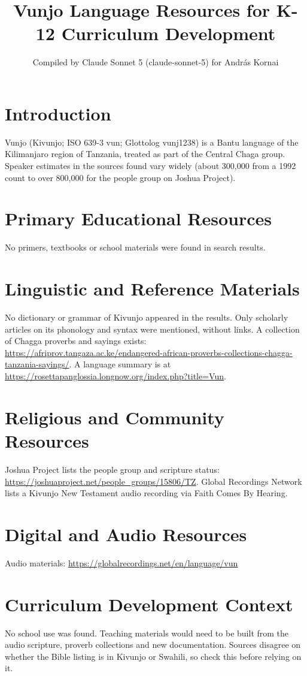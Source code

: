 \documentclass[12pt]{article}
\title{Vunjo Language Resources for K-12 Curriculum Development}
\author{Compiled by Claude Sonnet 5 (claude-sonnet-5) for Andr\'as Kornai}
\date{}
\begin{document}
\maketitle
\section{Introduction}
Vunjo (Kivunjo; ISO 639-3 vun; Glottolog vunj1238) is a Bantu language of the Kilimanjaro region of Tanzania, treated as part of the Central Chaga group. Speaker estimates in the sources found vary widely (about 300,000 from a 1992 count to over 800,000 for the people group on Joshua Project).
\section{Primary Educational Resources}
No primers, textbooks or school materials were found in search results.
\section{Linguistic and Reference Materials}
No dictionary or grammar of Kivunjo appeared in the results. Only scholarly articles on its phonology and syntax were mentioned, without links. A collection of Chagga proverbs and sayings exists: \url{https://afriprov.tangaza.ac.ke/endangered-african-proverbs-collections-chagga-tanzania-sayings/}. A language summary is at \url{https://rosettapanglossia.longnow.org/index.php?title=Vun}.
\section{Religious and Community Resources}
Joshua Project lists the people group and scripture status: \url{https://joshuaproject.net/people_groups/15806/TZ}. Global Recordings Network lists a Kivunjo New Testament audio recording via Faith Comes By Hearing.
\section{Digital and Audio Resources}
Audio materials: \url{https://globalrecordings.net/en/language/vun}
\section{Curriculum Development Context}
No school use was found. Teaching materials would need to be built from the audio scripture, proverb collections and new documentation. Sources disagree on whether the Bible listing is in Kivunjo or Swahili, so check this before relying on it.
\end{document}

